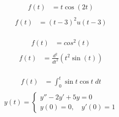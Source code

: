 \documentclass{article}
\newcommand{\laplace}[1]{\mathcal{L}\left\{#1\right\}}
\begin{document}
\begin{multicols}{2}
    \noindent
    \begin{align*}
        f(t) &= t\cos(2t) \\
    \end{align*}
    \columnbreak
    \begin{align*}
        f(t) &= (t-3)^2u(t-3) \\
    \end{align*}
\end{multicols}
\vspace{3cm}

\begin{multicols}{2}
    \noindent
    \begin{align*}
        f(t) &= cos^2(t) \\
    \end{align*}
    \columnbreak
    \begin{align*}
        f(t) &= \frac{d^2}{dt^2}(t^2\sin(t)) \\
    \end{align*}
\end{multicols}
\pagebreak
\begin{multicols}{2}
    \noindent
    \begin{align*}
        f(t) &= \int_0^t \sin{t} \cos{t} \; dt \\
    \end{align*}
    \begin{equation*}
    y(t) =
        \begin{cases}
            y'' - 2y' + 5y = 0 \\
            y(0) = 0, \quad y'(0) = 1
        \end{cases}
    \end{equation*}
\end{multicols}
\vspace{5cm}
\end{document}
